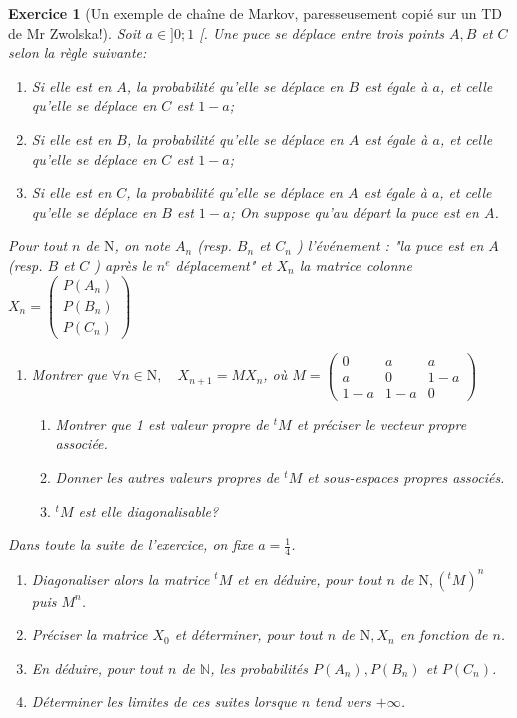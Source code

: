 \documentclass[12pt,a4paper]{article}
\theoremstyle{break}
\theoremstyle{break}
\newtheorem{Exo}{Exercice}
\begin{document}
\begin{Exo}[Un exemple de chaîne de Markov, paresseusement copié sur un TD de Mr Zwolska!]

	Soit $a \in] 0 ; 1$ [. Une puce se déplace entre trois points $A, B$ et $C$ selon la règle suivante:
	\begin{enumerate}
		\item
		Si elle est en $A$, la probabilité qu'elle se déplace en $B$ est égale à $a$, et celle qu'elle se déplace en $C$ est $1-a$;
		\item
		Si elle est en $B$, la probabilité qu'elle se déplace en $A$ est égale à $a$, et celle qu'elle se déplace en $C$ est $1-a$;
		\item
		Si elle est en $C$, la probabilité qu'elle se déplace en $A$ est égale à $a$, et celle qu'elle se déplace en $B$ est $1-a$; On suppose qu'au départ la puce est en $A$.
	\end{enumerate}

	Pour tout $n$ de $\mathrm{N}$, on note $A_{n}$ (resp. $B_{n}$ et $C_{n}$ ) l'événement : "la puce est en $A$ (resp. $B$ et $C$ ) après le $n^e$ déplacement" et $X_{n}$ la matrice colonne $X_{n}=\left(\begin{array}{l}P\left(A_{n}\right) \\ P\left(B_{n}\right) \\ P\left(C_{n}\right)\end{array}\right)$
	
	\begin{enumerate}
		\item
		Montrer que $\forall n \in \mathrm{N}, \quad X_{n+1}=M X_{n}$, où $M=\left(\begin{array}{ccc}0 & a & a \\ a & 0 & 1-a \\ 1-a & 1-a & 0\end{array}\right)$
		\begin{enumerate}
			\item
			Montrer que 1 est valeur propre de ${ }^{t} M$ et préciser le vecteur propre associée.
			\item
			Donner les autres valeurs propres de ${ }^{t} M$ et sous-espaces propres associés.
			\item
			${ }^{t} M$ est elle diagonalisable?
		\end{enumerate}
	\end{enumerate}

	Dans toute la suite de l'exercice, on fixe $a=\frac{1}{4}$.
	\begin{enumerate}
		\item
		Diagonaliser alors la matrice ${ }^{t} M$ et en déduire, pour tout $n$ de $\mathrm{N},\left({ }^{t} M\right)^{n}$ puis $M^{n}$.
		\item
		Préciser la matrice $X_{0}$ et déterminer, pour tout $n$ de $\mathrm{N}, X_{n}$ en fonction de $n$.
		\item
		En déduire, pour tout $n$ de $\mathbb{N}$, les probabilités $P\left(A_{n}\right), P\left(B_{n}\right)$ et $P\left(C_{n}\right)$.
		\item
		Déterminer les limites de ces suites lorsque $n$ tend vers $+\infty$.
	\end{enumerate}
\end{Exo}
\end{document}
